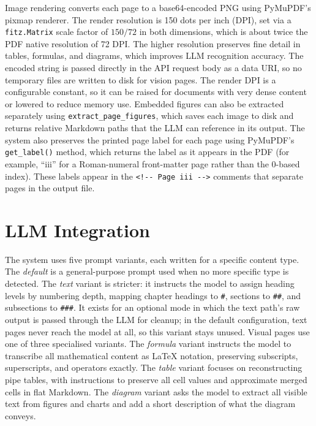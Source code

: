 Image rendering converts each page to a base64-encoded PNG using PyMuPDF's pixmap renderer.
The render resolution is 150 dots per inch (DPI), set via a \texttt{fitz.Matrix} scale factor of $150/72$ in both dimensions, which is about twice the PDF native resolution of 72 DPI.
The higher resolution preserves fine detail in tables, formulas, and diagrams, which improves LLM recognition accuracy.
The encoded string is passed directly in the API request body as a data URI, so no temporary files are written to disk for vision pages.
The render DPI is a configurable constant, so it can be raised for documents with very dense content or lowered to reduce memory use.
Embedded figures can also be extracted separately using \texttt{extract\_page\_figures}, which saves each image to disk and returns relative Markdown paths that the LLM can reference in its output.
The system also preserves the printed page label for each page using PyMuPDF's \texttt{get\_label()} method, which returns the label as it appears in the PDF (for example, ``iii'' for a Roman-numeral front-matter page rather than the 0-based index). These labels appear in the \texttt{<!{-}{-} Page iii -{-}>} comments that separate pages in the output file.

\section{LLM Integration}

The system uses five prompt variants, each written for a specific content type.
The \textit{default} is a general-purpose prompt used when no more specific type
is detected. The \textit{text} variant is stricter: it instructs
the model to assign heading levels by numbering depth, mapping chapter headings
to \texttt{\#}, sections to \texttt{\#\#}, and subsections to \texttt{\#\#\#}.
It exists for an optional mode in which the text path's raw output is passed
through the LLM for cleanup; in the default configuration, text pages never
reach the model at all, so this variant stays unused.
Visual pages use one of three specialised variants. The \textit{formula} variant
instructs the model to transcribe all mathematical content as \LaTeX{} notation,
preserving subscripts, superscripts, and operators exactly. The \textit{table}
variant focuses on reconstructing pipe tables, with instructions to preserve all
cell values and approximate merged cells in flat Markdown. The \textit{diagram}
variant asks the model to extract all visible text from figures and charts and
add a short description of what the diagram conveys.

